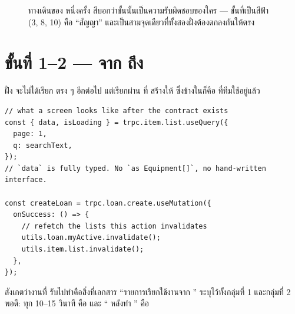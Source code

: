 \begin{figure}[H]
\caption{ทางเดินของ  หนึ่งครั้ง สีบอกว่าขั้นนั้นเป็นความรับผิดชอบของใคร --- ขั้นที่เป็นสีฟ้า (3, 8, 10) คือ ``สัญญา'' และเป็นสามจุดเดียวที่ทั้งสองฝั่งต้องตกลงกันให้ตรง}
\label{fig:pipeline}
\end{figure}

\section{ขั้นที่ 1--2 --- จาก  ถึง }

ฝั่ง  จะไม่ได้เรียก  ตรง ๆ อีกต่อไป แต่เรียกผ่าน 
ที่  สร้างให้ ซึ่งข้างในก็คือ  ที่ทีมใช้อยู่แล้ว

\begin{lstlisting}
// what a screen looks like after the contract exists
const { data, isLoading } = trpc.item.list.useQuery({
  page: 1,
  q: searchText,
});
// `data` is fully typed. No `as Equipment[]`, no hand-written interface.

const createLoan = trpc.loan.create.useMutation({
  onSuccess: () => {
    // refetch the lists this action invalidates
    utils.loan.myActive.invalidate();
    utils.item.list.invalidate();
  },
});
\end{lstlisting}

สังเกตว่างานที่  รับไปทำคือสิ่งที่เอกสาร
``รายการเรียกใช้งานจาก '' ระบุไว้ทั้งกลุ่มที่ 1 และกลุ่มที่ 2 พอดี:
 ทุก 10--15 วินาที คือ  และ ``
หลังทำ '' คือ 


